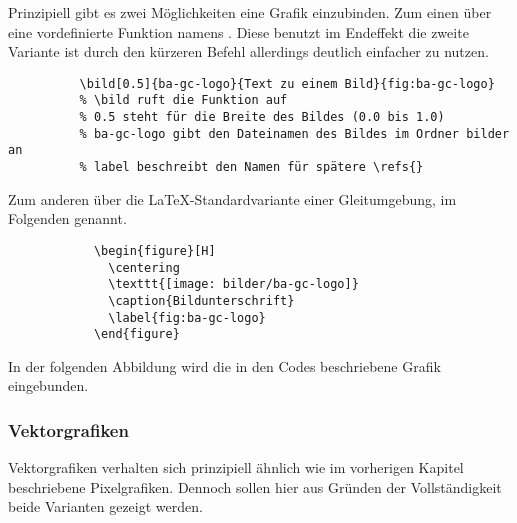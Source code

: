       Prinzipiell gibt es zwei Möglichkeiten eine Grafik einzubinden.
      Zum einen über eine vordefinierte Funktion namens \texttt{\bild{}}. 
      Diese benutzt im Endeffekt die zweite Variante ist durch den kürzeren Befehl allerdings deutlich einfacher zu nutzen.
            
      \begin{code}[H]
        \begin{verbatim}
          \bild[0.5]{ba-gc-logo}{Text zu einem Bild}{fig:ba-gc-logo}
          % \bild ruft die Funktion auf
          % 0.5 steht für die Breite des Bildes (0.0 bis 1.0)
          % ba-gc-logo gibt den Dateinamen des Bildes im Ordner bilder an
          % label beschreibt den Namen für spätere \refs{}
        \end{verbatim}
        \caption{Grafiken mittels Bild-Funktion einbinden}
        \label{code:bild-einfuegen1}
        \end{code}

        Zum anderen über die \LaTeX-Standardvariante einer Gleitumgebung, im Folgenden  genannt.

        \begin{code}[H]
          \begin{verbatim}
            \begin{figure}[H]
              \centering 
              \texttt{[image: bilder/ba-gc-logo]}
              \caption{Bildunterschrift}
              \label{fig:ba-gc-logo}
            \end{figure}
          \end{verbatim}
          \caption{Grafiken mittels Environments einfügen}
          \label{code:bild-einfuegen2}
        \end{code}

        In der folgenden Abbildung wird die in den Codes beschriebene Grafik eingebunden.

  \subsubsection{Vektorgrafiken}
    \label{sec:vectorgrafiken}
    Vektorgrafiken verhalten sich prinzipiell ähnlich wie im vorherigen Kapitel beschriebene Pixelgrafiken.
    Dennoch sollen hier aus Gründen der Vollständigkeit beide Varianten gezeigt werden.


